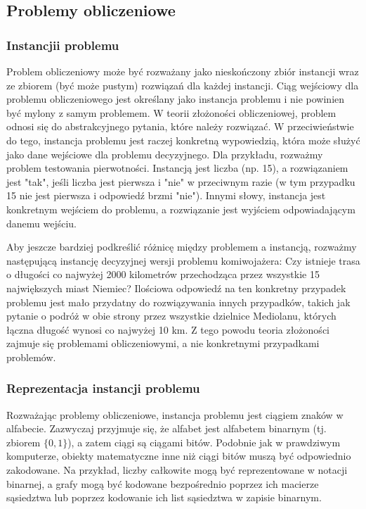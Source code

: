 	\subsection{Problemy obliczeniowe}

		\subsubsection{Instancjii problemu}
Problem obliczeniowy może być rozważany jako nieskończony zbiór instancji wraz ze zbiorem (być może pustym) rozwiązań dla każdej instancji. Ciąg wejściowy dla problemu obliczeniowego jest określany jako instancja problemu i nie powinien być mylony z samym problemem. W teorii złożoności obliczeniowej, problem odnosi się do abstrakcyjnego pytania, które należy rozwiązać. W przeciwieństwie do tego, instancja problemu jest raczej konkretną wypowiedzią, która może służyć jako dane wejściowe dla problemu decyzyjnego. Dla przykładu, rozważmy problem testowania pierwotności. Instancją jest liczba (np. 15), a rozwiązaniem jest "tak", jeśli liczba jest pierwsza i "nie" w przeciwnym razie (w tym przypadku 15 nie jest pierwsza i odpowiedź brzmi "nie"). Innymi słowy, instancja jest konkretnym wejściem do problemu, a rozwiązanie jest wyjściem odpowiadającym danemu wejściu.

Aby jeszcze bardziej podkreślić różnicę między problemem a instancją, rozważmy następującą instancję decyzyjnej wersji problemu komiwojażera: Czy istnieje trasa o długości co najwyżej 2000 kilometrów przechodząca przez wszystkie 15 największych miast Niemiec? Ilościowa odpowiedź na ten konkretny przypadek problemu jest mało przydatny do rozwiązywania innych przypadków, takich jak pytanie o podróż w obie strony przez wszystkie dzielnice Mediolanu, których łączna długość wynosi co najwyżej 10 km. Z tego powodu teoria złożoności zajmuje się problemami obliczeniowymi, a nie konkretnymi przypadkami problemów.

		\subsubsection{Reprezentacja instancji problemu}

Rozważając problemy obliczeniowe, instancja problemu jest ciągiem znaków w alfabecie. Zazwyczaj przyjmuje się, że alfabet jest alfabetem binarnym (tj. zbiorem $\{0,1\}$), a zatem ciągi są ciągami bitów. Podobnie jak w prawdziwym komputerze, obiekty matematyczne inne niż ciągi bitów muszą być odpowiednio zakodowane. Na przykład, liczby całkowite mogą być reprezentowane w notacji binarnej, a grafy mogą być kodowane bezpośrednio poprzez ich macierze sąsiedztwa lub poprzez kodowanie ich list sąsiedztwa w zapisie binarnym.

